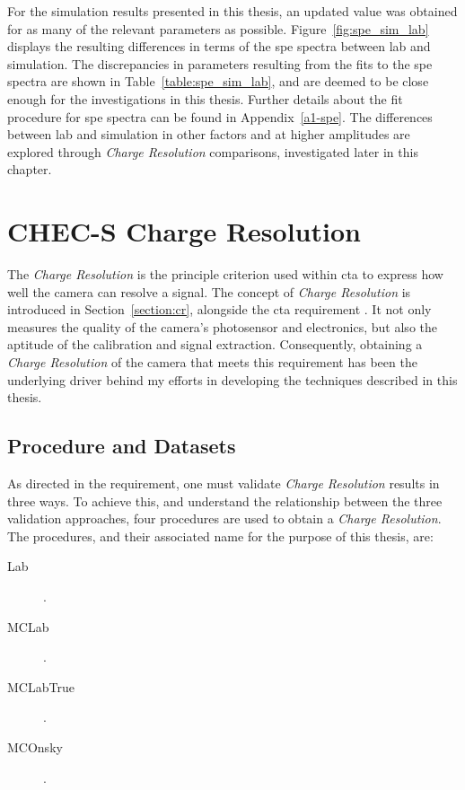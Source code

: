 For the simulation results presented in this thesis, an updated value was obtained for as many of the relevant  parameters as possible. Figure~\ref{fig:spe_sim_lab} displays the resulting differences in terms of the \gls{spe} spectra between lab and simulation. The discrepancies in parameters resulting from the fits to the \gls{spe} spectra are shown in Table~\ref{table:spe_sim_lab}, and are deemed to be close enough for the investigations in this thesis. Further details about the fit procedure for \gls{spe} spectra can be found in Appendix~\ref{a1-spe}. The differences between lab and simulation in other factors and at higher amplitudes are explored through \textit{Charge Resolution} comparisons, investigated later in this chapter.

\section{CHEC-S Charge Resolution}

The \textit{Charge Resolution} is the principle criterion used within \gls{cta} to express how well the camera can resolve a signal. The concept of \textit{Charge Resolution} is introduced in Section~\ref{section:cr}, alongside the \gls{cta} requirement . It not only measures the quality of the camera's photosensor and electronics, but also the aptitude of the calibration and signal extraction. Consequently, obtaining a \textit{Charge Resolution} of the camera that meets this requirement has been the underlying driver behind my efforts in developing the techniques described in this thesis.

\subsection{Procedure and Datasets}

As directed in the  requirement, one must validate \textit{Charge Resolution} results in three ways. To achieve this, and understand the relationship between the three validation approaches, four procedures are used to obtain a \textit{Charge Resolution}. The procedures, and their associated name for the purpose of this thesis, are:

\begin{description}
\item [Lab] .
\item [MCLab] .
\item [MCLabTrue] . 
\item [MCOnsky] .
\end{description}


